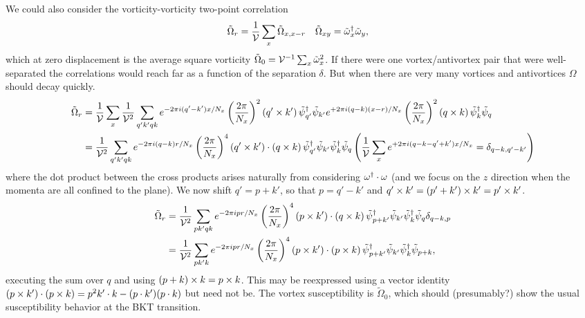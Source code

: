 We could also consider the vorticity-vorticity two-point correlation
\begin{align}
	\tilde{\Omega}_{r} &= \frac{1}{\mathcal{V}} \sum_x \tilde{\Omega}_{x,x-r}
	&
	\tilde{\Omega}_{xy} &= \tilde{\omega}{}^{\dagger}_x \tilde{\omega}_y,
\end{align}
which at zero displacement is the average square vorticity $\tilde{\Omega}_0 = \mathcal{V}^{-1} \sum_x \tilde{\omega}^2_x$.
If there were one vortex/antivortex pair that were well-separated the correlations would reach far as a function of the separation $\delta$.
But when there are very many vortices and antivortices $\Omega$ should decay quickly.
\begin{align}
	\tilde{\Omega}_{r}
	&=
	\frac{1}{\mathcal{V}} \sum_{x}
	\frac{1}{\mathcal{V}^2} \sum_{q'k'qk}
		e^{-2\pi i(q'-k')x/N_x} \left(\frac{2\pi}{N_x}\right)^2 (q' \times k')\, \tilde{\psi}{}^{\dagger}_{q'} \tilde{\psi}_{k'}
		e^{+2\pi i(q-k)(x-r)/N_x} \left(\frac{2\pi}{N_x}\right)^2 (q \times k)\, \tilde{\psi}{}^{\dagger}_{k} \tilde{\psi}_q
	\nonumber\\
	&=
	\frac{1}{\mathcal{V}^2} \sum_{q'k'qk}
		e^{-2\pi i(q-k)r/N_x} \left(\frac{2\pi}{N_x}\right)^4 (q' \times k')\cdot(q \times k)\,
		\tilde{\psi}{}^{\dagger}_{q'} \tilde{\psi}_{k'}
		\tilde{\psi}{}^{\dagger}_{k} \tilde{\psi}_q
		\left(\frac{1}{\mathcal{V}} \sum_{x}
			e^{+2\pi i(q-k-q'+k') x / N_x}
			= \delta_{q-k,q'-k'}
			\right)
\end{align}
where the dot product between the cross products arises naturally from considering $\omega{}^{\dagger} \cdot \omega$ (and we focus on the $z$ direction when the momenta are all confined to the plane).
We now shift $q' = p+k'$, so that $p=q'-k'$ and $q'\times k' = (p'+k')\times k' = p' \times k'$.
\begin{align}
	\tilde{\Omega}_{r}
	&=
	\frac{1}{\mathcal{V}^2} \sum_{pk'qk}
		e^{-2\pi ipr/N_x} \left(\frac{2\pi}{N_x}\right)^4 (p \times k')\cdot(q \times k)\,
		\tilde{\psi}{}^{\dagger}_{p+k'} \tilde{\psi}_{k'}
		\tilde{\psi}{}^{\dagger}_{k} \tilde{\psi}_q
		\delta_{q-k,p}
	\nonumber\\
	&=
	\frac{1}{\mathcal{V}^2} \sum_{pk'k}
		e^{-2\pi ipr/N_x} \left(\frac{2\pi}{N_x}\right)^4 (p \times k')\cdot(p \times k)\,
		\tilde{\psi}{}^{\dagger}_{p+k'} \tilde{\psi}_{k'}
		\tilde{\psi}{}^{\dagger}_{k} \tilde{\psi}_{p+k},
\end{align}
executing the sum over $q$ and using $(p+k)\times k = p\times k$.
This may be reexpressed using a vector identity $(p \times k')\cdot(p \times k) = p^2 k' \cdot k - (p \cdot k')(p \cdot k)$ but need not be.
The vortex susceptibility is $\tilde{\Omega}_0$, which should (presumably?) show the usual susceptibility behavior at the BKT transition.
